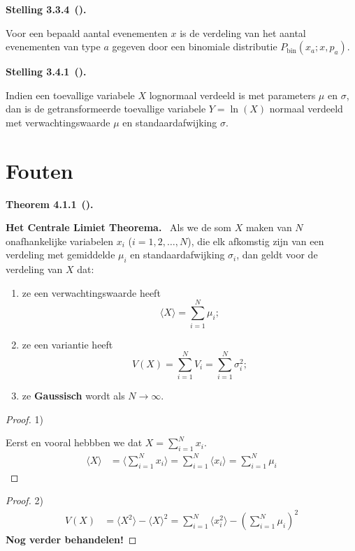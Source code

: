\documentclass[10pt,a4paper]{article}
\newenvironment{res}[3][]{%
  \begin{tcolorbox}[
    breakable,          %
    colback=gray!10,    %
    colframe=gray!40,   %
    boxrule=0.5pt,      %
    left=6pt, right=6pt, top=6pt, bottom=6pt %
  ]
  \noindent\textbf{#2 #3}\if\relax\detokenize{#1}\relax\else\ \textbf{(#1)}\fi\textbf{.}~\ignorespaces
}{%
  \end{tcolorbox}
}
\newcommand{\restitle}[1]{\textbf{#1.}\ }
\begin{document}
\begin{res}{Stelling}{3.3.4}
Voor een bepaald aantal evenementen $x$ is de verdeling van het aantal evenementen van type $a$ gegeven door een binomiale distributie $P_{\mathrm{bin}}(x_a;x,p_a)$.
\end{res}

\begin{res}{Stelling}{3.4.1}
Indien een toevallige variabele $X$ lognormaal verdeeld is met parameters $\mu$ en $\sigma$, dan is de getransformeerde toevallige variabele $Y=\ln(X)$ normaal verdeeld met verwachtingswaarde $\mu$ en standaardafwijking $\sigma$.
\end{res}

\section{Fouten}

\begin{res}{Theorem}{4.1.1}
\restitle{Het Centrale Limiet Theorema}
Als we de som $X$ maken van $N$ onafhankelijke variabelen $x_i$ ($i=1,2,\dots,N$), die elk afkomstig zijn van een verdeling met gemiddelde $\mu_i$ en standaardafwijking $\sigma_i$, dan geldt voor de verdeling van $X$ dat:
\begin{enumerate}[label=\arabic*.,leftmargin=1.8em,itemsep=1pt,topsep=1pt]
\item ze een verwachtingswaarde heeft
\[
\langle X\rangle = \sum_{i=1}^N \mu_i;
\]
\item ze een variantie heeft
\[
V(X) = \sum_{i=1}^N V_i = \sum_{i=1}^N \sigma_i^2;
\]
\item ze \textbf{Gaussisch} wordt als $N\to\infty$.
\end{enumerate}
\end{res}
\begin{proof} 1)

  Eerst en vooral hebbben we dat \(X = \sum_{i=1}^{N}x_i\).
  \begin{align*}
    \langle X \rangle &=
    \langle \sum_{i=1}^{N}x_i \rangle
    = \sum_{i=1}^{N} \langle x_i \rangle
    =\sum_{i=1}^{N} \mu_i
  \end{align*}
\end{proof}
\begin{proof} 2)
  \begin{align*}
    V(X) &= \langle X^2 \rangle - \langle X \rangle^2
    = \sum_{i=1}^{N}\langle x_i^2 \rangle - \left(\sum_{i=1}^{N} \mu_i\right)^2
  \end{align*}
  \textbf{Nog verder behandelen!}
\end{proof}
\end{document}
